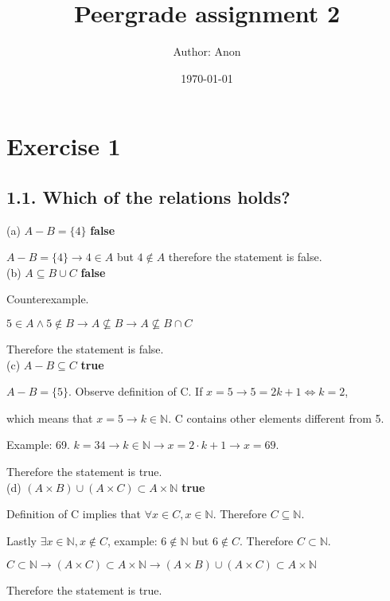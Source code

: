 \documentclass[a4paper,11pt]{article}
\title{Peergrade assignment 2}
\author{Author: Anon}
\date{\today}
\begin{document}
 

\maketitle

\section*{Exercise 1}

\subsection*{1.1. Which of the relations holds?}

\noindent (a) $A - B = \{4\}$ \textbf{false}

$A-B = \{4\} \to 4 \in A$ but $4 \notin A$ therefore the statement is false.\\

\noindent (b) $A \subseteq B \cup C$ \textbf{false}

Counterexample.

$5 \in A \land 5 \notin B \to A \nsubseteq B \to A \nsubseteq B \cap C$

Therefore the statement is false.\\

\noindent (c) $A - B \subseteq C$ \textbf{true}

$A-B = \{5\}$. Observe definition of C. If $x=5 \to 5 = 2k + 1 \iff k = 2$,

which means that $x=5 \to k \in \mathbb{N}$. C contains other elements different from 5.

Example: 69. $k=34 \to k \in \mathbb{N} \to x=2 \cdot k + 1 \to x = 69$.

Therefore the statement is true.\\

\noindent (d) $(A \times B) \cup (A \times C) \subset A \times \mathbb{N}$ \textbf{true}

Definition of C implies that $\forall x \in C, x \in \mathbb{N}$. Therefore $C \subseteq \mathbb{N}$.

Lastly $\exists x \in \mathbb{N}, x \notin C$, example: $6 \notin \mathbb{N}$ but $6 \notin C$. Therefore $C \subset \mathbb{N}$.

$C \subset \mathbb{N} \to (A \times C) \subset A \times \mathbb{N} \to (A \times B) \cup (A \times C) \subset A \times \mathbb{N}$

Therefore the statement is true.
\end{document}

